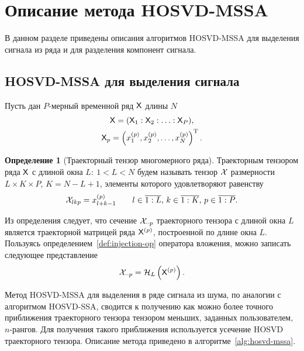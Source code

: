 \documentclass[specialist,
  substylefile=spbu.rtx,
subf,href,colorlinks=true, 12pt]{disser}
\theoremstyle{plain}
\theoremstyle{definition}
\newtheorem{definition}{Определение}[section]
\theoremstyle{remark}
\begin{document}

\section{Описание метода HOSVD-MSSA}\label{sec:Tensor-MSSA-method-description}
В данном разделе приведены описания алгоритмов HOSVD-MSSA для выделения сигнала из ряда и для разделения компонент сигнала.
\subsection{HOSVD-MSSA для выделения сигнала}\label{subsec:Tensor-MSSA-method-signal-description}
Пусть дан $P$-мерный временной ряд $\mathsf{X}$ длины $N$
\begin{gather*}
  \mathsf{X} = (\mathsf{X}_1: \mathsf{X}_2: \ldots: \mathsf{X}_P), \\
  \mathsf{X}_p = \left(x_1^{(p)}, x_2^{(p)}, \ldots, x_N^{(p)}\right)^{\mathrm{T}}.
\end{gather*}

\begin{definition}[Траекторный тензор многомерного ряда]
  \label{def:trajectory-tensor-mssa}
  Траекторным тензором ряда $\mathsf{X}$ с длиной окна $L:\: 1< L < N$ будем называть тензор $\mathcal{X}$
  размерности ${L \times K \times P}$, ${K = N - L + 1}$, элементы которого удовлетворяют равенству
  \[
    \mathcal{X}_{lkp}=x_{l+k-1}^{(p)} \qquad l \in \overline{1:L},\, k \in \overline{1:K},\, p \in \overline{1:P}.
  \]
\end{definition}

Из определения следует, что сечение $\mathcal{X}_{\cdot \cdot p}$ траекторного тензора с длиной окна $L$
является траекторной матрицей ряда $\mathsf{X}^{(p)}$, построенной по длине окна $L$.
Пользуясь определением~\ref{def:injection-op} оператора вложения, можно записать следующее представление
\[
  \mathcal{X}_{\cdot \cdot p} = \mathcal{H}_L \left(\mathsf{X}^{(p)}\right).
\]

Метод HOSVD-MSSA для выделения в ряде сигнала из шума, по аналогии с алгоритмом HOSVD-SSA,
сводится к получению как можно более точного приближения траекторного тензора тензором меньших,
заданных пользователем, $n$-рангов.
Для получения такого приближения используется усечение HOSVD траекторного тензора.
Описание метода приведено в алгоритме~\ref{alg:hosvd-mssa}.
\end{document}
